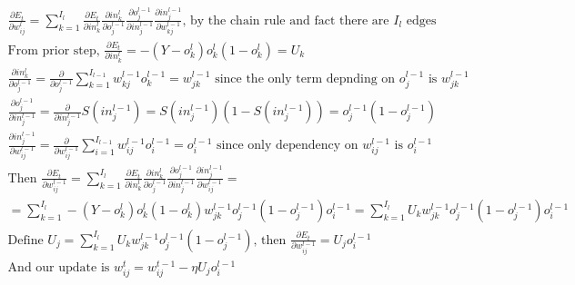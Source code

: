 \documentclass[11pt]{article}
\begin{document}
\begin{gather*}
\frac{\partial E_{t}}{\partial w_{ij}^{l}} = 
\sum_{k = 1}^{I_{l}} 
\frac{\partial E_{t}}{\partial in_{k}^{l}} 
\frac{\partial in_{k}^{l}}{\partial o_{j}^{l - 1}} 
\frac{\partial o_{j}^{l - 1}}{\partial in_{j}^{l - 1}} 
\frac{\partial in_{j}^{l - 1}}{\partial w_{k j}^{l - 1}}
\text{, by the chain rule and fact there are } I_{l} \text{ edges}\\
\text{From prior step, } \frac{\partial E_{t}}{\partial in_{k}^{l}} = 
- (Y - o_{k}^{l}) o_{k}^{l} (1 - o_{k}^{l}) = U_{k}\\
\frac{\partial in_{k}^{l}}{\partial o_{j}^{l - 1}} = 
\frac{\partial}{\partial o_{j}^{l - 1}} 
\sum_{k = 1}^{I_{l - 1}} w_{kj}^{l - 1} o_{k}^{l - 1} = 
w_{j k}^{l - 1} \text{ since the only term depnding on } 
o_{j}^{l - 1} \text{ is } w_{j k}^{l - 1}\\
\frac{\partial o_{j}^{l - 1}}{\partial in_{j}^{l - 1}} = 
\frac{\partial}{\partial in_{j}^{l - 1}} S(in_{j}^{l - 1}) = 
S(in_{j}^{l - 1}) (1 - S(in_{j}^{l - 1})) = 
o_{j}^{l - 1} (1 - o_{j}^{l - 1})\\
\frac{\partial in_{j}^{l - 1}}{\partial w_{ij}^{l - 1}} = 
\frac{\partial}{\partial w_{ij}^{l - 1}} 
\sum_{i = 1}^{I_{l - 1}} w_{ij}^{l - 1} o_{i}^{l - 1} = o_{i}^{l - 1} 
\text{ since only dependency on } w_{ij}^{l - 1} 
\text{ is } o_{i}^{l - 1}\\
\text{Then } 
\frac{\partial E_{t}}{\partial w_{i j}^{l - 1}} = 
\sum_{k = 1}^{I_{l}} 
\frac{\partial E_{t}}{\partial in_{k}^{l}} 
\frac{\partial in_{k}^{l}}{\partial o_{j}^{l - 1}} 
\frac{\partial o_{j}^{l - 1}}{\partial in_{j}^{l - 1}} 
\frac{\partial in_{j}^{l - 1}}{\partial w_{i j}^{l - 1}} = \\
= 
\sum_{k = 1}^{I_{l}} 
- (Y - o_{k}^{l}) o_{k}^{l} (1 - o_{k}^{l})
w_{j k}^{l - 1}
o_{j}^{l - 1} (1 - o_{j}^{l - 1}) 
o_{i}^{l - 1} = 
\sum_{k = 1}^{I_{l}} 
U_{k}
w_{j k}^{l - 1}
o_{j}^{l - 1} (1 - o_{j}^{l - 1}) 
o_{i}^{l - 1}\\
\text{Define } U_{j} = 
\sum_{k = 1}^{I_{l}} 
U_{k}
w_{j k}^{l - 1}
o_{j}^{l - 1} (1 - o_{j}^{l - 1}) 
\text{, then } 
\frac{\partial E_{t}}{\partial w_{i j}^{l - 1}} = 
U_{j} o_{i}^{l - 1}\\
\text{And our update is } 
w_{ij}^{t} = w_{ij}^{t - 1} - 
\eta U_{j} o_{i}^{l - 1}
\end{gather*}
\end{document}
